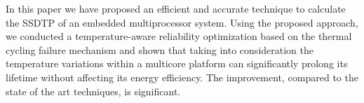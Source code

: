 In this paper we have proposed an efficient and accurate technique to calculate the SSDTP of an embedded multiprocessor system. Using the proposed approach, we conducted a temperature-aware reliability optimization based on the thermal cycling failure mechanism and shown that taking into consideration the temperature variations within a multicore platform can significantly prolong its lifetime without affecting its energy efficiency. The improvement, compared to the state of the art techniques, is significant.
